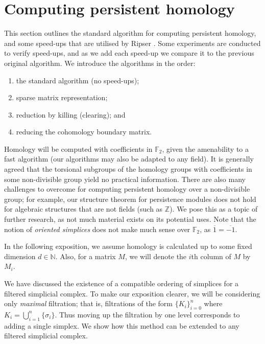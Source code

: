 \clearpage\section{Computing persistent homology}
\label{sec:computing-persistent-homology}
This section outlines the standard algorithm for computing persistent homology, and some speed-ups that are utilised by Ripser \cite{bauer2021ripser}. Some experiments are conducted to verify speed-ups, and as we add each speed-up we compare it to the previous original algorithm. We introduce the algorithms in the order:

\begin{enumerate}
  \item the standard algorithm (no speed-ups);
  \item sparse matrix representation;
  \item reduction by killing (clearing); and
  \item reducing the cohomology boundary matrix.
\end{enumerate}

Homology will be computed with coefficients in $\mathbb F_2$, given the amenability to a fast algorithm (our algorithms may also be adapted to any field). It is generally agreed that the torsional subgroups of the homology groups with coefficients in some non-divisible group yield no practical information. There are also many challenges to overcome for computing persistent homology over a non-divisible group; for example, our structure theorem for persistence modules does not hold for algebraic structures that are not fields (such as $\mathbb Z$). We pose this as a topic of further research, as not much material exists on its potential uses. Note that the notion of \emph{oriented simplices} does not make much sense over $\mathbb F_2$, as $\overline 1 = \overline{-1}$. 

In the following exposition, we assume homology is calculated up to some fixed dimension $d \in \mathbb N$. Also, for a matrix $M$, we will denote the $i$th column of $M$ by $M_i$. 

We have discussed the existence of a compatible ordering of simplices for a filtered simplicial complex. To make our exposition clearer, we will be considering only \emph{maximal} filtration; that is, filtrations of the form $\{K_i\}_{i=0}^n$ where $K_i = \bigcup_{i=1}^n \{\sigma_i\}$. Thus moving up the filtration by one level corresponds to adding a single simplex. We show how this method can be extended to any filtered simplicial complex.

